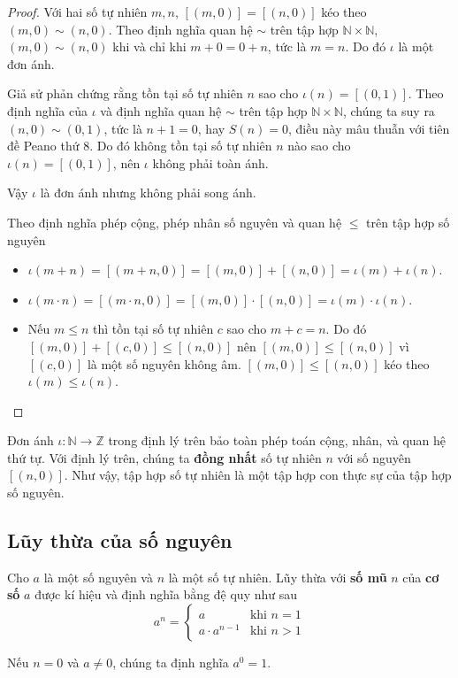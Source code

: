 \begin{proof}
    Với hai số tự nhiên $m, n$, $[(m, 0)] = [(n, 0)]$ kéo theo $(m, 0)\sim (n, 0)$. Theo định nghĩa quan hệ $\sim$ trên tập hợp $\mathbb{N}\times\mathbb{N}$, $(m, 0)\sim (n, 0)$ khi và chỉ khi $m + 0 = 0 + n$, tức là $m = n$. Do đó $\iota$ là một đơn ánh.

    Giả sử phản chứng rằng tồn tại số tự nhiên $n$ sao cho $\iota(n) = [(0, 1)]$. Theo định nghĩa của $\iota$ và định nghĩa quan hệ $\sim$ trên tập hợp $\mathbb{N}\times\mathbb{N}$, chúng ta suy ra $(n, 0)\sim (0, 1)$, tức là $n + 1 = 0$, hay $S(n) = 0$, điều này mâu thuẫn với tiên đề Peano thứ 8. Do đó không tồn tại số tự nhiên $n$ nào sao cho $\iota(n) = [(0, 1)]$, nên $\iota$ không phải toàn ánh.

    Vậy $\iota$ là đơn ánh nhưng không phải song ánh.

    Theo định nghĩa phép cộng, phép nhân số nguyên và quan hệ $\leq$ trên tập hợp số nguyên
    \begin{itemize}
        \item $\iota(m + n) = [(m + n, 0)] = [(m, 0)] + [(n, 0)] = \iota(m) + \iota(n)$.
        \item $\iota(m\cdot n) = [(m\cdot n, 0)] = [(m, 0)]\cdot [(n, 0)] = \iota(m)\cdot\iota(n)$.
        \item Nếu $m\leq n$ thì tồn tại số tự nhiên $c$ sao cho $m + c = n$. Do đó $[(m, 0)] + [(c, 0)]\leq [(n, 0)]$ nên $[(m, 0)]\leq [(n, 0)]$ vì $[(c, 0)]$ là một số nguyên không âm. $[(m, 0)]\leq [(n, 0)]$ kéo theo $\iota(m)\leq\iota(n)$.
    \end{itemize}
\end{proof}

Đơn ánh $\iota: \mathbb{N}\to \mathbb{Z}$ trong định lý trên bảo toàn phép toán cộng, nhân, và quan hệ thứ tự. Với định lý trên, chúng ta \textbf{đồng nhất} số tự nhiên $n$ với số nguyên $[(n, 0)]$. Như vậy, tập hợp số tự nhiên là một tập hợp con thực sự của tập hợp số nguyên.

\subsection{Lũy thừa của số nguyên}

\begin{definition}
    Cho $a$ là một số nguyên và $n$ là một số tự nhiên. Lũy thừa với \textbf{số mũ} $n$ của \textbf{cơ số} $a$ được kí hiệu và định nghĩa bằng đệ quy như sau
    \[
        a^{n} = \begin{cases}
            a              & \text{khi $n = 1$} \\
            a\cdot a^{n-1} & \text{khi $n > 1$}
        \end{cases}
    \]

    Nếu $n = 0$ và $a\ne 0$, chúng ta định nghĩa $a^{0} = 1$.
\end{definition}

